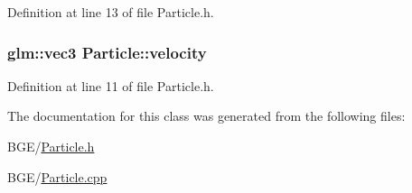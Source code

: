 Definition at line 13 of file Particle.\-h.

\hypertarget{class_particle_ad29958c8e765528930f7694a0a819c04}{
\subsubsection[{velocity}]{\setlength{\rightskip}{0pt plus 5cm}glm\-::vec3 Particle\-::velocity}}\label{class_particle_ad29958c8e765528930f7694a0a819c04}


Definition at line 11 of file Particle.\-h.



The documentation for this class was generated from the following files\-:\begin{DoxyCompactItemize}
\item 
B\-G\-E/\hyperlink{_particle_8h}{Particle.\-h}\item 
B\-G\-E/\hyperlink{_particle_8cpp}{Particle.\-cpp}\end{DoxyCompactItemize}

